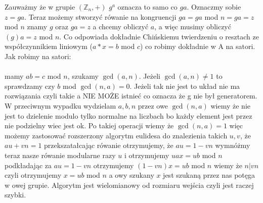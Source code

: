 Zauważmy że w grupie $(\mathbb{Z}_{n},+)$ $g^{a}$ oznacza to samo co $ga$. Oznaczmy sobie $z = ga$. Teraz możemy stworzyć rówanie na kongruencji $ga = ga$ mod $n = ga = z$ mod $n$ znamy $g$ oraz $ga = z$ a chcemy obliczyć $a$, a więc musimy obliczyć $(g)a = z$ mod $n$. Co odpowiada dokładnie Chińskiemu twierdzeniu o resztach ze współczynnikiem liniowym ($a * x = b$ mod $c$) co robimy dokładnie w A na satori. Jak robimy na satori:\\ \\
mamy $ab = c$ mod $n$, szukamy $\gcd(a,n)$. Jeżeli $\gcd(a,n) \neq 1$ to sprawdzamy czy $b$ mod $\gcd(n,a) = 0$. Jeżeli tak nie jest to układ nie ma rozwiązania czyli takie a NIE MOŻE istnieć co oznacza że g nie był generatorem. W przeciwnym wypadku wydzielam $a,b,n$ przez owe $\gcd(n,a)$ wiemy że nie jest to dzielenie modulo tylko normalne na liczbach bo każdy element jest przez nie podzielny wiec jest ok. Po takiej operacji wiemy że $\gcd(n,a) = 1$ więc możemy zastosować rozszerzony algorytm eulidesa do znalezienia takich $u,v$, że $au + vn = 1$ przekszatałcając rówanie otrzymujemy, że $au = 1 - vn$ wymnóżmy teraz nasze rówanie modularne razy $u$ i otrzymujemy $uax = ub$ mod $n$ podkładając za $au = 1 - vn$ otrzymujemy $(1 - vn)x = ub$ mod $n$ wiemy że $n | vn$ czyli otrzymujemy $x = ub$ mod $n$ a owy szukany $x$ jest szukaną przez nas potęga w owej grupie. Algorytm jest wielomianowy od rozmiaru wejścia czyli jest raczej szybki.



